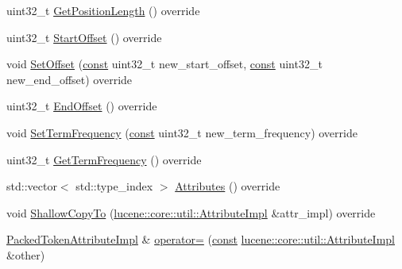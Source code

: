 \begin{DoxyCompactItemize}
uint32\+\_\+t \mbox{\hyperlink{classlucene_1_1core_1_1analysis_1_1tokenattributes_1_1PackedTokenAttributeImpl_a4b5a93a1d9b61cf1504b382d24c1e6d9}{Get\+Position\+Length}} () override
\item 
uint32\+\_\+t \mbox{\hyperlink{classlucene_1_1core_1_1analysis_1_1tokenattributes_1_1PackedTokenAttributeImpl_aea927563f771802e2ea6356814b53c17}{Start\+Offset}} () override
\item 
void \mbox{\hyperlink{classlucene_1_1core_1_1analysis_1_1tokenattributes_1_1PackedTokenAttributeImpl_aa17ed401f2b9f6bd773291de1d02bb35}{Set\+Offset}} (\mbox{\hyperlink{ZlibCrc32_8h_a2c212835823e3c54a8ab6d95c652660e}{const}} uint32\+\_\+t new\+\_\+start\+\_\+offset, \mbox{\hyperlink{ZlibCrc32_8h_a2c212835823e3c54a8ab6d95c652660e}{const}} uint32\+\_\+t new\+\_\+end\+\_\+offset) override
\item 
uint32\+\_\+t \mbox{\hyperlink{classlucene_1_1core_1_1analysis_1_1tokenattributes_1_1PackedTokenAttributeImpl_ae6210d544884be562c186a040d91157f}{End\+Offset}} () override
\item 
void \mbox{\hyperlink{classlucene_1_1core_1_1analysis_1_1tokenattributes_1_1PackedTokenAttributeImpl_a4d9dfc6cc7c825d42789245b8ca003c4}{Set\+Term\+Frequency}} (\mbox{\hyperlink{ZlibCrc32_8h_a2c212835823e3c54a8ab6d95c652660e}{const}} uint32\+\_\+t new\+\_\+term\+\_\+frequency) override
\item 
uint32\+\_\+t \mbox{\hyperlink{classlucene_1_1core_1_1analysis_1_1tokenattributes_1_1PackedTokenAttributeImpl_a82aff8ded68bf64ab156382ca6862db2}{Get\+Term\+Frequency}} () override
\item 
std\+::vector$<$ std\+::type\+\_\+index $>$ \mbox{\hyperlink{classlucene_1_1core_1_1analysis_1_1tokenattributes_1_1PackedTokenAttributeImpl_a450b5fd90cbf05268800b0f66eebb58f}{Attributes}} () override
\item 
void \mbox{\hyperlink{classlucene_1_1core_1_1analysis_1_1tokenattributes_1_1PackedTokenAttributeImpl_ab89c820321f0f5b84c7a392bb8de32f3}{Shallow\+Copy\+To}} (\mbox{\hyperlink{classlucene_1_1core_1_1util_1_1AttributeImpl}{lucene\+::core\+::util\+::\+Attribute\+Impl}} \&attr\+\_\+impl) override
\item 
\mbox{\hyperlink{classlucene_1_1core_1_1analysis_1_1tokenattributes_1_1PackedTokenAttributeImpl}{Packed\+Token\+Attribute\+Impl}} \& \mbox{\hyperlink{classlucene_1_1core_1_1analysis_1_1tokenattributes_1_1PackedTokenAttributeImpl_a9519720f5eb790ef3e796cefbcbecc96}{operator=}} (\mbox{\hyperlink{ZlibCrc32_8h_a2c212835823e3c54a8ab6d95c652660e}{const}} \mbox{\hyperlink{classlucene_1_1core_1_1util_1_1AttributeImpl}{lucene\+::core\+::util\+::\+Attribute\+Impl}} \&other)

\end{DoxyCompactItemize}
